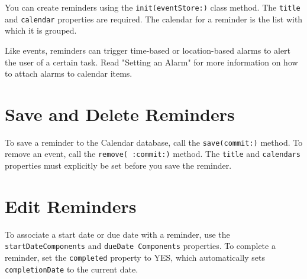\documentclass{article}
\begin{document}
\noindent{}

You can create reminders using the \texttt{init(eventStore:)} class method. The \texttt{title} and \texttt{calendar} properties are required. The calendar for a reminder is the list with which it is grouped.

Like events, reminders can trigger time-based or location-based alarms to alert the user of a certain task. Read "Setting an Alarm" for more information on how to attach alarms to calendar items.

\section*{Save and Delete Reminders}
To save a reminder to the Calendar database, call the \texttt{save(commit:)} method. To remove an event, call the \texttt{remove( :commit:)} method. The \texttt{title} and \texttt{calendars} properties must explicitly be set before you save the reminder.

\noindent{}

\section*{Edit Reminders}
To associate a start date or due date with a reminder, use the \texttt{startDateComponents} and \texttt{dueDate Components} properties. To complete a reminder, set the \texttt{completed} property to YES, which automatically sets \texttt{completionDate} to the current date.

\noindent{}
\end{document}
